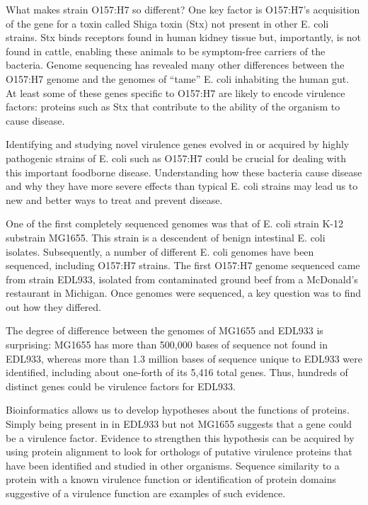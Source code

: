What makes strain O157:H7 so different? One key factor is O157:H7's acquisition of the gene for a toxin called Shiga toxin (Stx) not present in other E. coli strains.  Stx binds receptors found in human kidney tissue but, importantly, is not found in cattle, enabling these animals to be symptom-free carriers of the bacteria.  Genome sequencing has revealed many other differences between the O157:H7 genome and the genomes of ``tame'' E. coli inhabiting the human gut.  At least some of these genes specific to O157:H7 are likely to encode virulence factors: proteins such as Stx that contribute to the ability of the organism to cause disease.

Identifying and studying novel virulence genes evolved in or acquired by highly pathogenic strains of E. coli such as O157:H7 could be crucial for dealing with this important foodborne disease.  Understanding how these bacteria cause disease and why they have more severe effects than typical E. coli strains may lead us to new and better ways to treat and prevent disease.  

One of the first completely sequenced genomes was that of E. coli strain K-12 substrain MG1655.  This strain is a descendent of benign intestinal E. coli isolates.  Subsequently, a number of different E. coli genomes have been sequenced, including O157:H7 strains.  The first O157:H7 genome sequenced came from strain EDL933, isolated from contaminated ground beef from a McDonald's restaurant in Michigan.  Once genomes were sequenced, a key question was to find out how they differed.  

The degree of difference between the genomes of MG1655 and EDL933 is surprising:  MG1655 has more than 500,000 bases of sequence not found in EDL933, whereas more than 1.3 million bases of sequence unique to EDL933 were identified, including about one-forth of its 5,416 total genes.  Thus, hundreds of distinct genes could be virulence factors for EDL933.

Bioinformatics allows us to develop hypotheses about the functions of proteins.  Simply being present in in EDL933 but not MG1655 suggests that a gene could be a virulence factor.  Evidence to strengthen this hypothesis can be acquired by using protein alignment to look for orthologs of putative virulence proteins that have been identified and studied in other organisms.  Sequence similarity to a protein with a known virulence function or identification of protein domains suggestive of a virulence function are examples of such evidence.  

